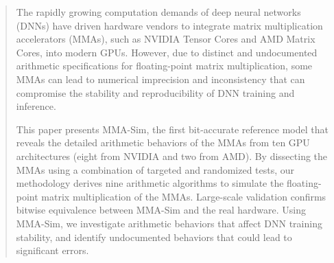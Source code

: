 \begin{abstract}
The rapidly growing computation demands of deep neural networks (DNNs) have driven hardware vendors to integrate matrix multiplication accelerators (MMAs), such as NVIDIA Tensor Cores and AMD Matrix Cores, into modern GPUs. However, due to distinct and undocumented arithmetic specifications for floating-point matrix multiplication, some MMAs can lead to numerical imprecision and inconsistency that can compromise the stability and reproducibility of DNN training and inference.

This paper presents MMA-Sim, the first bit-accurate reference model that reveals the detailed arithmetic behaviors of the MMAs from ten GPU architectures (eight from NVIDIA and two from AMD). By dissecting the MMAs using a combination of targeted and randomized tests, our methodology derives nine arithmetic algorithms to simulate the floating-point matrix multiplication of the MMAs. Large-scale validation confirms bitwise equivalence between MMA-Sim and the real hardware. Using MMA-Sim, we investigate arithmetic behaviors that affect DNN training stability, and identify undocumented behaviors that could lead to significant errors.
    
\end{abstract}